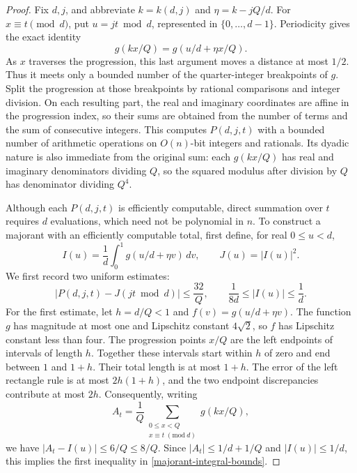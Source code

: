 \begin{proof}
Fix \(d,j\), and abbreviate \(k=k(d,j)\) and \(\eta=k-jQ/d\).
For \(x\equiv t\pmod d\), put \(u=jt\bmod d\), represented in
\(\{0,\ldots,d-1\}\).  Periodicity gives the exact identity
\[
 g(kx/Q)=g(u/d+\eta x/Q).
\]
As \(x\) traverses the progression, this last argument moves a distance at
most \(1/2\).  Thus it meets only a bounded number of the quarter-integer
breakpoints of \(g\).  Split the progression at those breakpoints by rational
comparisons and integer division.  On each resulting part, the real and
imaginary coordinates are affine in the progression index, so their sums
are obtained from the number of terms and the sum of consecutive integers.
This computes \(P(d,j,t)\) with a bounded number of arithmetic operations
on \(O(n)\)-bit integers and rationals.  Its dyadic nature is also immediate
from the original sum: each \(g(kx/Q)\) has real and imaginary denominators
dividing \(Q\), so the squared modulus after division by \(Q\) has denominator
dividing \(Q^4\).

Although each \(P(d,j,t)\) is efficiently computable, direct summation over
\(t\) requires \(d\) evaluations, which need not be polynomial in \(n\).
To construct a majorant with an efficiently computable total, first define,
for real \(0\le u<d\),
\begin{equation}\label{majorant-integral}
 I(u)=\frac1d\int_0^1g(u/d+\eta v)\,dv,
 \qquad J(u)=|I(u)|^2.
\end{equation}
We first record two uniform estimates:
\begin{equation}\label{majorant-integral-bounds}
 |P(d,j,t)-J(jt\bmod d)|\le\frac{32}{Q},
 \qquad
 \frac1{8d}\le |I(u)|\le\frac1d.
\end{equation}
For the first estimate, let \(h=d/Q<1\) and
\(f(v)=g(u/d+\eta v)\).  The function \(g\) has magnitude at most one and
Lipschitz constant \(4\sqrt2\), so \(f\) has Lipschitz constant less than
four.  The progression points \(x/Q\) are the left endpoints of intervals
of length \(h\).  Together these intervals start within \(h\) of zero and
end between \(1\) and \(1+h\).  Their total length is at most \(1+h\).
The error of the left rectangle rule is at most \(2h(1+h)\), and the two
endpoint discrepancies contribute at most \(2h\).  Consequently, writing
\[
 A_t=\frac1Q\sum_{\substack{0\le x<Q\\x\equiv t\;(\mathrm{mod}\ d)}}g(kx/Q),
\]
we have \(|A_t-I(u)|\le 6/Q\le8/Q\).  Since
\(|A_t|\le 1/d+1/Q\) and \(|I(u)|\le1/d\), this implies the first
inequality in \eqref{majorant-integral-bounds}.


\end{proof}
